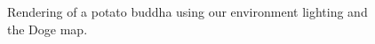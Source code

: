 \begin{figure}
{}
\caption{Rendering of a potato buddha using our environment lighting and the Doge map.}
\label{fig:pathbuddhaenv}
\end{figure}

